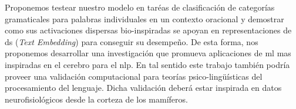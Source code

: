 Proponemos testear nuestro modelo en taréas de clasificación de categorías gramaticales para palabras individuales en un contexto oracional y demostrar como sus activaciones dispersas bio-inspiradas se apoyan en representaciones de \gls{ds} (\emph{Text Embedding}) para conseguir su desempeño.
De esta forma, nos proponemos desarrollar una investigación que promueva aplicaciones de \gls{ml} mas inspiradas en el cerebro para el \gls{nlp}.
En tal sentido este trabajo también podría proveer una validación computacional para teorías psico-lingüísticas del procesamiento del lenguaje.
Dicha validación deberá estar inspirada en datos neurofisiológicos desde la corteza de los mamíferos.
























